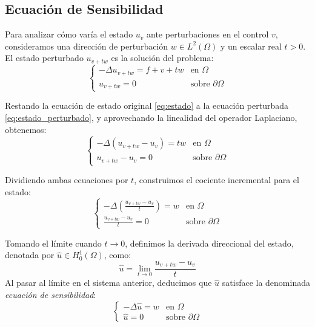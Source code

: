 \documentclass[11pt,a4paper]{article}
\begin{document}
	\subsection{Ecuación de Sensibilidad}
	Para analizar cómo varía el estado $u_v$ ante perturbaciones en el control $v$, consideramos una dirección de perturbación $w \in L^2(\Omega)$ y un escalar real $t > 0$. El estado perturbado $u_{v+tw}$ es la solución del problema:
	\begin{equation} \label{eq:estado_perturbado}
		\begin{cases}
			-\Delta u_{v+tw} = f + v + tw & \text{en } \Omega \\
			u_{v+tw} = 0 & \text{sobre } \partial\Omega
		\end{cases}
	\end{equation}
	
	Restando la ecuación de estado original \eqref{eq:estado} a la ecuación perturbada \eqref{eq:estado_perturbado}, y aprovechando la linealidad del operador Laplaciano, obtenemos:
	\begin{equation*}
		\begin{cases}
			-\Delta (u_{v+tw} - u_v) = tw & \text{en } \Omega \\
			u_{v+tw} - u_v = 0 & \text{sobre } \partial\Omega
		\end{cases}
	\end{equation*}
	
	Dividiendo ambas ecuaciones por $t$, construimos el cociente incremental para el estado:
	\begin{equation*}
		\begin{cases}
			-\Delta \left( \frac{u_{v+tw} - u_v}{t} \right) = w & \text{en } \Omega \\
			\frac{u_{v+tw} - u_v}{t} = 0 & \text{sobre } \partial\Omega
		\end{cases}
	\end{equation*}
	
	Tomando el límite cuando $t \to 0$, definimos la derivada direccional del estado, denotada por $\hat{u} \in H^1_0(\Omega)$, como:
	\begin{equation*}
		\hat{u} = \lim_{t \to 0} \frac{u_{v+tw} - u_v}{t}
	\end{equation*}
	Al pasar al límite en el sistema anterior, deducimos que $\hat{u}$ satisface la denominada \textit{ecuación de sensibilidad}:
	\begin{equation} \label{eq:sensibilidad}
		\begin{cases}
			-\Delta \hat{u} = w & \text{en } \Omega \\
			\hat{u} = 0 & \text{sobre } \partial\Omega
		\end{cases}
	\end{equation}
	
\end{document}
